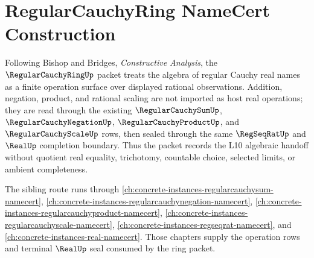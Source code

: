 \chapter{RegularCauchyRing NameCert Construction}
\label{ch:concrete-instances-regularcauchyring-namecert}

Following Bishop and Bridges, \emph{Constructive Analysis}, the $\RegularCauchyRingUp$ packet treats the algebra of regular Cauchy real names as a finite operation surface over displayed rational observations. Addition, negation, product, and rational scaling are not imported as host real operations; they are read through the existing $\RegularCauchySumUp$, $\RegularCauchyNegationUp$, $\RegularCauchyProductUp$, and $\RegularCauchyScaleUp$ rows, then sealed through the same $\RegSeqRatUp$ and $\RealUp$ completion boundary. Thus the packet records the L10 algebraic handoff without quotient real equality, trichotomy, countable choice, selected limits, or ambient completeness.

The sibling route runs through \autoref{ch:concrete-instances-regularcauchysum-namecert}, \autoref{ch:concrete-instances-regularcauchynegation-namecert}, \autoref{ch:concrete-instances-regularcauchyproduct-namecert}, \autoref{ch:concrete-instances-regularcauchyscale-namecert}, \autoref{ch:concrete-instances-regseqrat-namecert}, and \autoref{ch:concrete-instances-real-namecert}. Those chapters supply the operation rows and terminal $\RealUp$ seal consumed by the ring packet.

